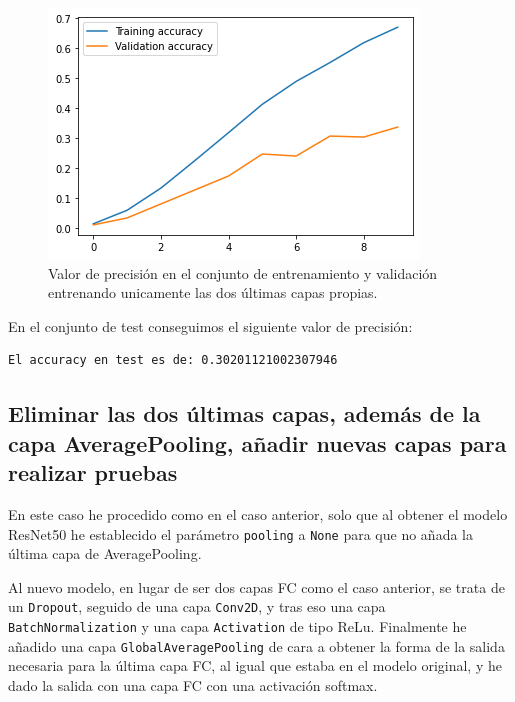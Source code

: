 \documentclass[12pt, spanish]{article}
\begin{document}
\begin{figure}[H]
  \centering
      \includegraphics[width=\textwidth]{3-1-a-2.png}
 		\caption{Valor de precisión en el conjunto de entrenamiento y validación entrenando unicamente las dos últimas capas propias.}
\end{figure}



En el conjunto de test conseguimos el siguiente valor de precisión:

\begin{lstlisting}
El accuracy en test es de: 0.30201121002307946
\end{lstlisting}




\subsection{Eliminar las dos últimas capas, además de la capa AveragePooling, añadir nuevas capas para realizar pruebas}

En este caso he procedido como en el caso anterior, solo que al obtener el modelo ResNet50 he establecido el parámetro \texttt{pooling} a \texttt{None} para que no añada la última capa de AveragePooling.

Al nuevo modelo, en lugar de ser dos capas FC como el caso anterior, se trata de un \texttt{Dropout}, seguido de una capa \texttt{Conv2D}, y tras eso una capa \texttt{BatchNormalization} y una capa \texttt{Activation} de tipo ReLu. Finalmente he añadido una capa \texttt{GlobalAveragePooling} de cara a obtener la forma de la salida necesaria para la última capa FC, al igual que estaba en el modelo original, y he dado la salida con una capa FC con una activación softmax.
\end{document}
